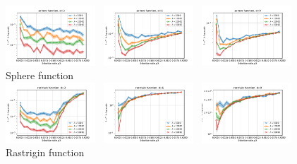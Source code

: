 



\begin{figure}[!h]
    \centering
    \includegraphics[width=0.3\textwidth]{sections/appendix/foga2021-kbest/plots/sphere_3.pdf}~ \includegraphics[width=0.3\textwidth]{sections/appendix/foga2021-kbest/plots/sphere_6.pdf}~    \includegraphics[width=0.3\textwidth]{sections/appendix/foga2021-kbest/plots/sphere_9.pdf}\\ Sphere function\\
    \includegraphics[width=0.3\textwidth]{sections/appendix/foga2021-kbest/plots/rastrigin_3.pdf}~ \includegraphics[width=0.3\textwidth]{sections/appendix/foga2021-kbest/plots/rastrigin_6.pdf}~     \includegraphics[width=0.3\textwidth]{sections/appendix/foga2021-kbest/plots/rastrigin_9.pdf}\\ Rastrigin function\\
    

\end{figure}
